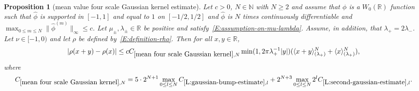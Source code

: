 \documentclass[12pt,reqno]{amsart}
\theoremstyle{plain}
\newtheorem{proposition}[theorem]{Proposition}
\numberwithin{equation}{section}
\theoremstyle{remark}
\newcommand{\uses}[1]{}
\newcommand{\usesdefs}[1]{}
\newcommand{\R}{{\mathbb R}}
\begin{document}
\begin{proposition}[mean value four scale Gaussian kernel estimate]\label{mean four scale Gaussian kernel}\uses{L:gaussian-bump-decomposition,mean value bump estimate 2,L:gaussian-bump-estimate,L:second-gaussian-estimate}\usesdefs{gaussian,bracket bump,auto:Wiener-space-definition}
Let $c>0$, $N\in \mathbb N$ with $N\geq 2$ and assume that $\phi$ is a $W_0(\R)$ function such that
$\widehat{\phi}$ is supported in $[-1,1]$ and equal to $1$ on $[-1/2,1/2]$ and $\widehat{\phi}$ is $N$ times continuously differentiable and $\max_{0\leq m \leq N} \|\widehat{\phi}^{(m)}\|_{\infty} \leq c$.
Let $\mu_\pm,\lambda_\pm\in\mathbb R$ be positive and satisfy~\eqref{E:assumption-on-mu-lambda}. Assume, in addition, that $\lambda_{+}=2\lambda_{-}$.
Let $\nu\in [-1,0)$ and let $\rho$ be defined by~\eqref{E:definition-rho}.
Then for all $x,y \in\mathbb{R}$,
\begin{equation}\label{E:mean-value}
|\rho(x+y)-\rho(x)| \le c C_{\ref{mean four scale Gaussian kernel},N} \min(1,2\pi \lambda_{+}^{-1}|y|) (\langle x+y\rangle^N_{(\lambda_+)}+
\langle x\rangle^N_{(\lambda_+)}),
\end{equation}
where
\begin{equation}\label{auto:mean-four-scale-Gaussian-constant} C_{\ref{mean four scale Gaussian kernel},N} =  5\cdot 2^{N+1}\max_{0\leq l \leq N} C_{\ref{L:gaussian-bump-estimate},l} +2^{N+3}\max_{0\leq l \leq N} 2^lC_{\ref{L:second-gaussian-estimate},l}.\end{equation}


\end{proposition}
\end{document}
